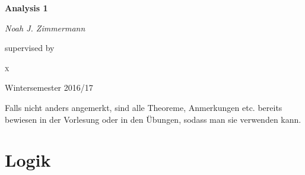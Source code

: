 \documentclass[headsepline,12pt,a4paper]{scrartcl}
\begin{document}
\begin{titlepage}
	\centering
	{\huge\bfseries Analysis 1\par}
	\vspace{2cm}
	{\Large\itshape Noah J. Zimmermann\par}
	\vfill
	supervised by\par
	 \textsc{x}

	\vfill

	{\large Wintersemester 2016/17\par}
\end{titlepage}

\tableofcontents

\newpage

Falls nicht anders angemerkt, sind alle Theoreme, Anmerkungen etc. bereits bewiesen in der Vorlesung oder in den Übungen, sodass man sie verwenden kann. \\

\section*{Logik}
\end{document}
